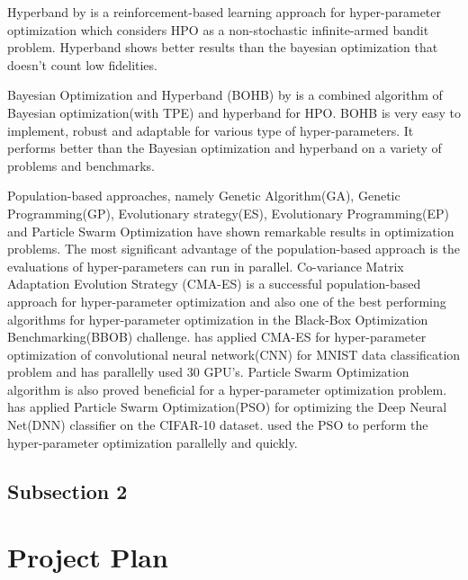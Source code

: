 \documentclass[thesis]{mas_proposal}
\begin{document}
Hyperband by \citet{li2016hyperband} is a reinforcement-based learning approach for hyper-parameter optimization which considers HPO as a non-stochastic infinite-armed bandit problem. Hyperband shows better results than the bayesian optimization that doesn't count low fidelities.\cite{li2016hyperband}\cite{feurer_hyperparameter_2018}

Bayesian Optimization and Hyperband (BOHB) by \citet{falkner2018bohb}  is a combined algorithm of Bayesian optimization(with TPE) and hyperband for HPO.  BOHB is very easy to implement, robust and adaptable for various type of hyper-parameters.  It performs better than the Bayesian optimization and hyperband on a variety of problems and benchmarks. \cite{falkner2018bohb}\cite{feurer_hyperparameter_2018}

Population-based approaches, namely Genetic Algorithm(GA), Genetic Programming(GP), Evolutionary strategy(ES), Evolutionary Programming(EP) and Particle Swarm Optimization have shown remarkable results in optimization problems\cite{coello2007evolutionary}. The most significant advantage of the population-based approach is the evaluations of hyper-parameters can run in parallel.  Co-variance Matrix Adaptation Evolution Strategy (CMA-ES) is a successful population-based approach for hyper-parameter optimization\cite{loshchilov2016cma} and also one of the best performing algorithms for hyper-parameter optimization in the Black-Box Optimization Benchmarking(BBOB) challenge\cite{bbob}. \citet{loshchilov2016cma} has applied CMA-ES for hyper-parameter optimization of convolutional neural network(CNN) for MNIST data classification problem and has parallelly used 30 GPU's.  Particle Swarm Optimization algorithm is also proved beneficial for a hyper-parameter optimization problem. \citet{lorenzo2017particle} has applied Particle Swarm Optimization(PSO) for optimizing the Deep Neural Net(DNN) classifier on the CIFAR-10 dataset. \citet{lorenzo2017hyper} used the PSO to perform the hyper-parameter optimization parallelly and quickly. \cite{feurer_hyperparameter_2018}






\subsection{Subsection 2}



\section{Project Plan}
\end{document}
